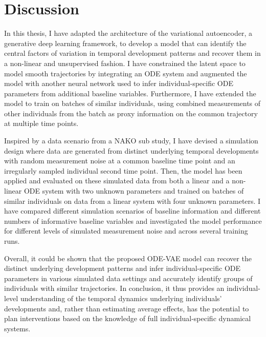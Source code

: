 \chapter{Discussion}\label{chap:discussion}
\fancyhead[LO]{\nouppercase{\leftmark}}

In this thesis, I have adapted the architecture of the variational autoencoder, a generative deep learning framework, to develop a model that can identify the central factors of variation in temporal development patterns and recover them in a non-linear and unsupervised fashion. I have constrained the latent space to model smooth trajectories by integrating an ODE system and augmented the model with another neural network used to infer individual-specific ODE parameters from additional baseline variables.
Furthermore, I have extended the model to train on batches of similar individuals, using combined measurements of other individuals from the batch as proxy information on the common trajectory at multiple time points. 

Inspired by a data scenario from a NAKO sub study, I have devised a simulation design where data are generated from distinct underlying temporal developments with random measurement noise at a common baseline time point and an irregularly sampled individual second time point. Then, the model has been applied and evaluated on these simulated data from both a linear and a non-linear ODE system with two unknown parameters and trained on batches of similar individuals on data from a linear system with four unknown parameters. I have compared different simulation scenarios of baseline information and different numbers of informative baseline variables and investigated the model performance for different levels of simulated measurement noise and across several training runs.

Overall, it could be shown that the proposed ODE-VAE model can recover the distinct underlying development patterns and infer individual-specific ODE parameters in various simulated data settings and accurately identify groups of individuals with similar trajectories. In conclusion, it thus provides an individual-level understanding of the temporal dynamics underlying individuals' developments and, rather than estimating average effects, has the potential to plan interventions based on the knowledge of full individual-specific dynamical systems.

